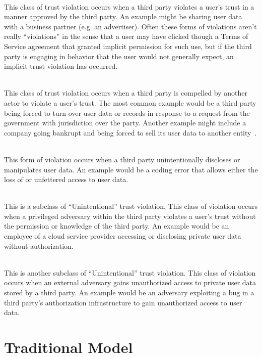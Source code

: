 \begin{packed_desc}
\item[Implicit (P):] \hfill \\ This class of trust violation occurs
  when a third party violates a user's trust in a manner approved by
  the third party. An example might be sharing user data with a
  business partner (e.g. an advertiser). Often these forms of
  violations aren't really ``violations'' in the sense that a user may
  have clicked though a Terms of Service agreement that granted
  implicit permission for such use, but if the third party is engaging
  in behavior that the user would not generally expect, an implicit
  trust violation has occurred.
\item[Compelled (C):] \hfill \\ This class of trust violation occurs
  when a third party is compelled by another actor to violate a user's
  trust. The most common example would be a third party being forced
  to turn over user data or records in response to a request from the
  government with jurisdiction over the party. Another example might
  include a company going bankrupt and being forced to sell its user
  data to another entity~\cite{solove2015}.
\item[Unintentional (U):] \hfill \\ This form of violation occurs when
  a third party unintentionally discloses or manipulates user data. An
  example would be a coding error that allows either the loss of or
  unfettered access to user data.
\item[Insider (I):] \hfill \\ This is a subclass of ``Unintentional''
  trust violation. This class of violation occurs when a privileged
  adversary within the third party violates a user's trust without the
  permission or knowledge of the third party. An example would be an
  employee of a cloud service provider accessing or disclosing private
  user data without authorization.
\item[Outsider (O):] \hfill \\ This is another subclass of
  ``Unintentional'' trust violation. This class of violation occurs
  when an external adversary gains unauthorized access to private user
  data stored by a third party. An example would be an adversary
  exploiting a bug in a third party's authorization infrastructure to
  gain unauthorized access to user data.
\end{packed_desc}

\section{Traditional Model}
\label{chap:trust:traditional}

